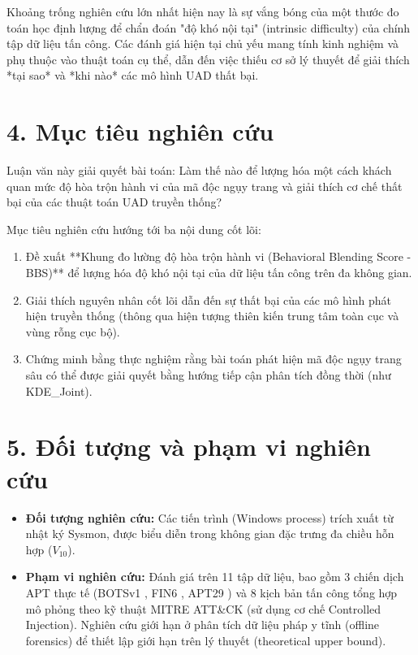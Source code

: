 \documentclass[../main.tex]{subfiles}
\begin{document}
Khoảng trống nghiên cứu lớn nhất hiện nay là sự vắng bóng của một thước đo toán học định lượng để chẩn đoán "độ khó nội tại" (intrinsic difficulty) của chính tập dữ liệu tấn công. Các đánh giá hiện tại chủ yếu mang tính kinh nghiệm và phụ thuộc vào thuật toán cụ thể, dẫn đến việc thiếu cơ sở lý thuyết để giải thích *tại sao* và *khi nào* các mô hình UAD thất bại.

\section*{4. Mục tiêu nghiên cứu}

Luận văn này giải quyết bài toán: Làm thế nào để lượng hóa một cách khách quan mức độ hòa trộn hành vi của mã độc ngụy trang và giải thích cơ chế thất bại của các thuật toán UAD truyền thống? 

Mục tiêu nghiên cứu hướng tới ba nội dung cốt lõi:
\begin{enumerate}
    \item Đề xuất **Khung đo lường độ hòa trộn hành vi (Behavioral Blending Score - BBS)** để lượng hóa độ khó nội tại của dữ liệu tấn công trên đa không gian.
    \item Giải thích nguyên nhân cốt lõi dẫn đến sự thất bại của các mô hình phát hiện truyền thống (thông qua hiện tượng thiên kiến trung tâm toàn cục và vùng rỗng cục bộ).
    \item Chứng minh bằng thực nghiệm rằng bài toán phát hiện mã độc ngụy trang sâu có thể được giải quyết bằng hướng tiếp cận phân tích đồng thời (như KDE\_Joint).
\end{enumerate}

\section*{5. Đối tượng và phạm vi nghiên cứu}

\begin{itemize}
    \item \textbf{Đối tượng nghiên cứu:} Các tiến trình (Windows process) trích xuất từ nhật ký Sysmon, được biểu diễn trong không gian đặc trưng đa chiều hỗn hợp ($V_{10}$).
    \item \textbf{Phạm vi nghiên cứu:} Đánh giá trên 11 tập dữ liệu, bao gồm 3 chiến dịch APT thực tế (BOTSv1 \cite{botsv1}, FIN6 \cite{mitre_fin6}, APT29 \cite{mitre_apt29}) và 8 kịch bản tấn công tổng hợp mô phỏng theo kỹ thuật MITRE ATT\&CK (sử dụng cơ chế Controlled Injection). Nghiên cứu giới hạn ở phân tích dữ liệu pháp y tĩnh (offline forensics) để thiết lập giới hạn trên lý thuyết (theoretical upper bound).
\end{itemize}
\end{document}
